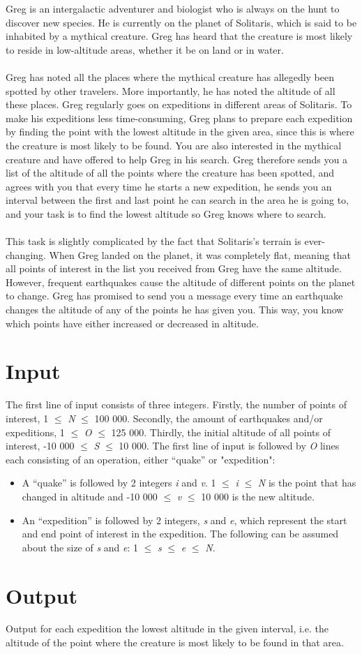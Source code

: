 Greg is an intergalactic adventurer and biologist who is always on the hunt to discover new species. He is currently on the planet of Solitaris, which is said to be inhabited by a mythical creature. Greg has heard that the creature is most likely to reside in low-altitude areas, whether it be on land or in water.
\\\\
Greg has noted all the places where the mythical creature has allegedly been spotted by other travelers. More importantly, he has noted the altitude of all these places. Greg regularly goes on expeditions in different areas of Solitaris. To make his expeditions less time-consuming, Greg plans to prepare each expedition by finding the point with the lowest altitude in the given area, since this is where the creature is most likely to be found. You are also interested in the mythical creature and have offered to help Greg in his search. Greg therefore sends you a list of the altitude of all the points where the creature has been spotted, and agrees with you that every time he starts a new expedition, he sends you an interval between the first and last point he can search in the area he is going to, and your task is to find the lowest altitude so Greg knows where to search.
\\\\
This task is slightly complicated by the fact that Solitaris’s terrain is ever-changing. When Greg landed on the planet, it was completely flat, meaning that all points of interest in the list you received from Greg have the same altitude. However, frequent earthquakes cause the altitude of different points on the planet to change. Greg has promised to send you a message every time an earthquake changes the altitude of any of the points he has given you. This way, you know which points have either increased or decreased in altitude.
\section*{Input}
The first line of input consists of three integers. Firstly, the number of points of interest, 1 $\leq$ \emph{N} $\leq$ 100 000. Secondly, the amount of earthquakes and/or expeditions, 1 $\leq$ \emph{O} $\leq$ 125 000. Thirdly, the initial altitude of all points of interest, -10 000 $\leq$ \emph{S} $\leq$ 10 000. The first line of input is followed by \emph{O} lines each consisting of an operation, either “quake” or "expedition":
\begin{itemize}
    \item A “quake” is followed by 2 integers \emph{i} and \emph{v}. 1 $\leq$ \emph{i} $\leq$ \emph{N} is the point that has changed in altitude and -10 000 $\leq$ \emph{v} $\leq$ 10 000 is the new altitude.
    \item An “expedition” is followed by 2 integers, \emph{s} and \emph{e}, which represent the start and end point of interest in the expedition. The following can be assumed about the size of \emph{s} and \emph{e}: 1 $\leq$ \emph{s} $\leq$ \emph{e} $\leq$ \emph{N}.
\end{itemize}
\section*{Output}
Output for each expedition the lowest altitude in the given interval, i.e. the altitude of the point where the creature is most likely to be found in that area.\\